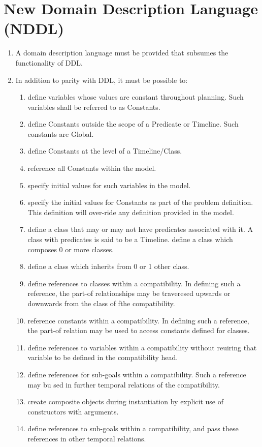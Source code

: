 \documentclass[twoside, 11pt]{article}
\begin{document}
\section{New Domain Description Language (NDDL)}
\begin{enumerate}
\item A domain description language must be provided that subsumes the functionality of DDL.
\item In addition to parity with DDL, it must be possible to:
\begin{enumerate}
\item define variables whose values are constant throughout planning. Such variables shall be referred to as Constants.
\item define Constants outside the scope of a Predicate or Timeline. Such constants are Global.
\item define Constants at the level of a Timeline/Class.
\item reference all Constants within the model.
\item specify initial values for such variables in the model.
\item specify the initial values for Constants as part of the problem definition. This definition will over-ride any definition provided in the model.
\item define a class that may or may not have predicates associated with it. A class with predicates is said to be a Timeline.
\itme define a class which composes 0 or more classes.
\item define a class which inherits from 0 or 1 other class.
\item define references to classes within a compatibility. In defining such a reference, the part-of relationships may be traveresed upwards or downwards from the class of fthe compatibility.
\item reference constants within a compatibility. In defining such a reference, the part-of relation may be used to access constants defined for classes.
\item define references to variables within a compatibility without reuiring that variable to be defined in the compatibility head.
\item define references for sub-goals within a compatibility. Such a reference may bu sed in further temporal relations of the compatibility. 
\item create composite objects during instantiation by explicit use of constructors with arguments.
\item define references to sub-goals within a compatibility, and pass these references in other temporal relations.

\end{enumerate}
\end{enumerate}
\end{document}
